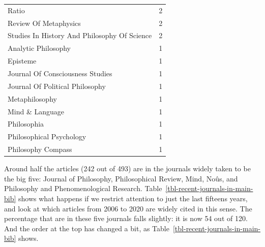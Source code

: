 \documentclass[
  10pt,
  letterpaper,
  DIV=11,
  numbers=noendperiod,
  twoside]{scrartcl}
\begin{document}
\begin{longtable}[]{@{}lr@{}}
Ratio & 2 \\
Review Of Metaphysics & 2 \\
Studies In History And Philosophy Of Science & 2 \\
Analytic Philosophy & 1 \\
Episteme & 1 \\
Journal Of Consciousness Studies & 1 \\
Journal Of Political Philosophy & 1 \\
Metaphilosophy & 1 \\
Mind \& Language & 1 \\
Philosophia & 1 \\
Philosophical Psychology & 1 \\
Philosophy Compass & 1 \\

\end{longtable}

Around half the articles (242 out of 493) are in the journals widely
taken to be the big five: Journal of Philosophy, Philosophical Review,
Mind, Noûs, and Philosophy and Phenomenological Research.
Table~\ref{tbl-recent-journals-in-main-bib} shows what happens if we
restrict attention to just the last fifteens years, and look at which
articles from 2006 to 2020 are widely cited in this sense. The
percentage that are in these five journals falls slightly: it is now 54
out of 120. And the order at the top has changed a bit, as
Table~\ref{tbl-recent-journals-in-main-bib} shows.
\end{document}
